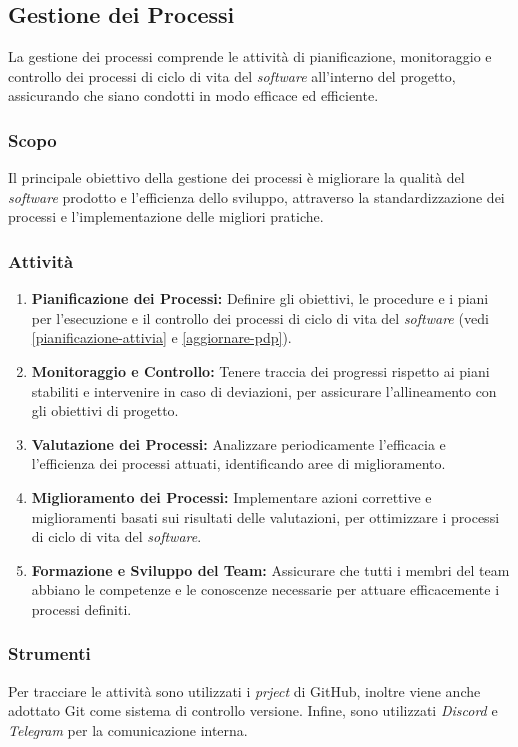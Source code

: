 \subsection{Gestione dei Processi}

La gestione dei processi comprende le attività di pianificazione, monitoraggio
e controllo dei processi di ciclo di vita del \textit{software} all'interno del
progetto, assicurando che siano condotti in modo efficace ed efficiente.

\subsubsection{Scopo}
Il principale obiettivo della gestione dei processi è migliorare la qualità
del \textit{software} prodotto e l'efficienza dello sviluppo, attraverso la
standardizzazione dei processi e l'implementazione delle migliori pratiche.

\subsubsection{Attività}
\begin{enumerate}
	\item \textbf{Pianificazione dei Processi:} Definire gli obiettivi, le
	      procedure e i piani per l'esecuzione e il controllo dei processi di
	      ciclo di vita del \textit{software} (vedi
	      \autoref{pianificazione-attivia} e \autoref{aggiornare-pdp}).
	\item \textbf{Monitoraggio e Controllo:} Tenere traccia dei progressi
	      rispetto ai piani stabiliti e intervenire in caso di deviazioni, per
	      assicurare l'allineamento con gli obiettivi di progetto.
	\item \textbf{Valutazione dei Processi:} Analizzare periodicamente
	      l'efficacia e l'efficienza dei processi attuati, identificando aree di
	      miglioramento.
	\item \textbf{Miglioramento dei Processi:} Implementare azioni correttive e
	      miglioramenti basati sui risultati delle valutazioni, per ottimizzare
	      i processi di ciclo di vita del \textit{software}.
	\item \textbf{Formazione e Sviluppo del Team:} Assicurare che tutti i membri
	      del team abbiano le competenze e le conoscenze necessarie per attuare
	      efficacemente i processi definiti.
\end{enumerate}

\subsubsection{Strumenti}
Per tracciare le attività sono utilizzati i \textit{prject} di GitHub, inoltre
viene anche adottato Git come sistema di controllo versione. Infine, sono
utilizzati \textit{Discord} e \textit{Telegram} per la comunicazione interna.

